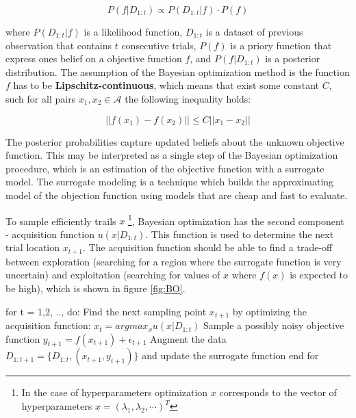 \begin{equation}
\label{eq:BO_posteriori}
    P(f|D_{1:t}) \propto P(D_{1:t} | f) \cdot  P(f)
\end{equation}

where $ P(D_{1:t} | f)$ is a likelihood function, $D_{1:t}$ is a dataset of previous observation that contains $t$  consecutive trials, $P(f)$ is a priory function that express ones belief on a objective function $f$, and  $P(f|D_{1:t})$ is a posterior distribution. The assumption of the Bayesian optimization method is the function $f$ has to be \textbf{Lipschitz-continuous}, which means that exist some constant $C$, such for all pairs $x_1, x_2  \in \mathcal{A}$ the following inequality holds:

\begin{equation}
||f(x_1)-f(x_2)|| \leq C ||x_1-x_2|| 
\end{equation}

The posterior probabilities capture updated beliefs about the unknown objective function. 
This may be interpreted as a single step of the Bayesian optimization procedure, which is an estimation of the objective function with a surrogate model. The surrogate modeling is a technique which builds the approximating model of the objection function using models that are cheap and fast to evaluate. 

To sample efficiently trails $x$ \footnote{In the case of hyperparameters optimization $x$ corresponds to the vector of hyperparameters $x= (\lambda_1, \lambda_2, \cdots)^{T}$}, Bayesian optimization has the second component - acquisition function $u(x|D_{1:t})$. This function is used to determine the next trial location $x_{t+1}$. The acquisition function should be able to find a trade-off between exploration (searching for a region where the surrogate function is very uncertain) and exploitation (searching for values of $x$ where $f(x)$ is expected to be high), which is shown in figure \ref{fig:BO}. 

\begin{algorithm}[caption={Bayesian Optimization}, label={alg:Bayesian Optimization}]
\label{alg:BO}
for t = 1,2, .., do:
   Find the next sampling point $x_{t+1}$ by optimizing the acquisition function: $x_t = argmax_x u(x| D_{1:t}) $
   Sample a possibly noisy objective function $y_{t+1} = f(x_{t+1}) + \epsilon_{t+1}$ 
   Augment the data $D_{1:t+1}= \{ D_{1:t}, (x_{t+1},y_{t+1} ) \} $ and update the surrogate function
end for
\end{algorithm}

